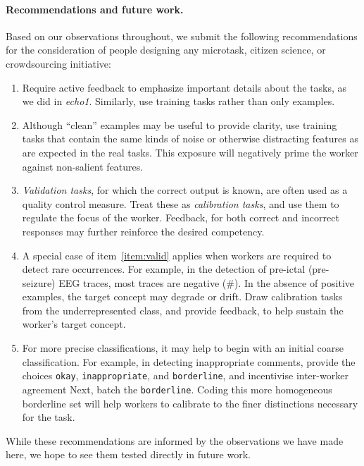 \documentclass[12pt]{article}
\begin{document}
\paragraph{Recommendations and future work.} 
Based on our observations throughout, we submit the following 
recommendations for the consideration of people designing 
any microtask, citizen science, or crowdsourcing initiative:
\begin{enumerate}
	\item{
		Require active feedback to emphasize important details about the 
		tasks, as we did in \textit{echo1}.  Similarly, use training tasks 
		rather than only examples.
	}
	\item{
		Although ``clean'' examples may be useful to provide clarity,
		use training tasks that contain the same kinds of noise or otherwise
		distracting features as are expected in the real tasks.
		This exposure will negatively prime the worker against non-salient 
		features.
	}
	\item{
		\textit{Validation tasks}, for which the correct output is known,
		are often used as a quality control measure.
		Treat these as \textit{calibration tasks}, and use them to regulate
		the focus of the worker.
		Feedback, for both correct and incorrect responses may further 
		reinforce the desired competency. \label{item:valid}
	}
	\item{
		A special case of item~\ref{item:valid} applies when workers are 
		required to detect rare occurrences.
		For example, in the detection of pre-ictal (pre-seizure) EEG traces, 
		most traces are negative (\#).  In the absence of positive 
		examples, the target concept may degrade or drift.
		Draw calibration tasks from the underrepresented class,
		and provide feedback, to help sustain the worker's target concept.
	}
	\item{
		For more precise classifications, it may help to begin with
		an initial coarse classification.  For example, in detecting 
		inappropriate comments, provide the choices   
		\texttt{okay}, \texttt{inappropriate}, and \texttt{borderline},
		and incentivise inter-worker agreement
		Next, batch the \texttt{borderline}.  Coding this more homogeneous
		borderline set will help workers to calibrate to the finer 
		distinctions necessary for the task.
	}
\end{enumerate}

While these recommendations are informed by the observations we have made 
here, we hope to see them tested directly in future work.
\end{document}
